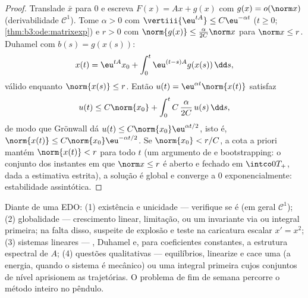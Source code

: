 \begin{proof}
Translade $\bar x$ para $0$ e escreva $F(x) = Ax + g(x)$ com $g(x) = o(\norm x)$
(derivabilidade $\mathcal C^1$). Tome $\alpha > 0$ com $\vertiii{\eu^{tA}} \leq C\eu^{-\alpha t}$ ($t \geq 0$; \cref{thm:b3:ode:matrixexp}) e
$r > 0$ com $\norm{g(x)} \leq \frac{\alpha}{2C}\norm x$ para $\norm x \leq
r$. Duhamel com $b(s) = g(x(s))$:
\[
x(t) = \eu^{tA}x_0 + \int_0^t\eu^{(t-s)A}g(x(s))\,\dd s,
\]
válido enquanto $\norm{x(s)} \leq r$. Então $u(t) =
\eu^{\alpha t}\norm{x(t)}$ satisfaz
\[
u(t) \leq C\norm{x_0} +
\int_0^{t}C\,\frac{\alpha}{2C}\,u(s)\,\dd s ,
\]
de modo que Grönwall dá $u(t) \leq C\norm{x_0}\eu^{\alpha t/2}$, isto é, $\norm{x(t)} \leq C\norm{x_0}\eu^{-\alpha t/2}$. Se $\norm{x_0} < r/C$, a cota a priori
mantém $\norm{x(t)} <
r$ para todo $t$ (um argumento de  e
bootstrapping: o conjunto dos instantes em que $\norm x \leq r$ é aberto e fechado
em $\intco0{T_+}$, dada a estimativa estrita), a solução é global e converge a
$0$ exponencialmente: estabilidade assintótica.
\end{proof}

\begin{method}\label{met:b3:ode:strategy}
Diante de uma EDO: (1) existência e unicidade --- verifique se é
 (em geral $\mathcal C^1$); (2) globalidade ---
crescimento linear, limitação, ou um  invariante via  ou integral primeira; na falta disso, suspeite de explosão e
teste na caricatura escalar $x' = x^2$; (3) sistemas lineares ---
, Duhamel e, para coeficientes constantes, a estrutura
espectral de $A$; (4) questões qualitativas --- equilíbrios,
linearize e cace uma  (a energia, quando o sistema é
mecânico) ou uma integral primeira cujos conjuntos de nível aprisionem
as trajetórias. O problema de fim de semana percorre o método inteiro no
pêndulo.
\end{method}

